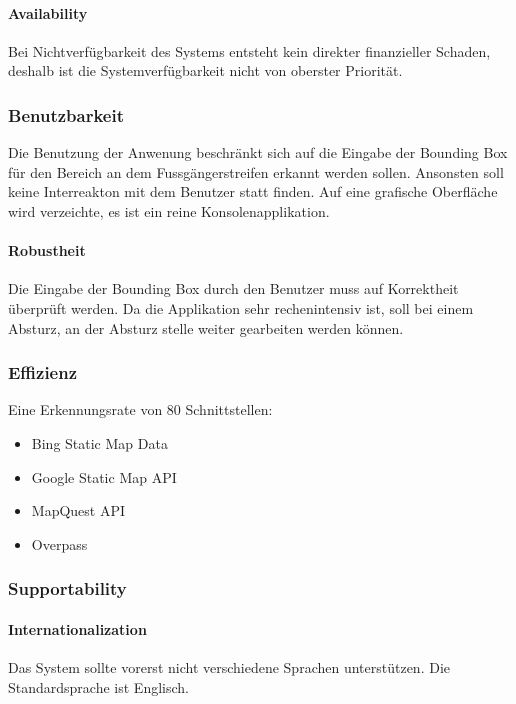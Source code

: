 \paragraph{Availability}
Bei Nichtverfügbarkeit des Systems entsteht kein direkter finanzieller Schaden, deshalb ist die Systemverfügbarkeit nicht von oberster Priorität. 
\subsubsection{Benutzbarkeit}
Die Benutzung der Anwenung beschränkt sich auf die Eingabe der Bounding Box für den Bereich an dem Fussgängerstreifen erkannt werden sollen. Ansonsten soll keine Interreakton mit dem Benutzer statt finden. Auf eine grafische Oberfläche wird verzeichte, es ist ein reine Konsolenapplikation.

\paragraph{Robustheit}
Die Eingabe der Bounding Box durch den Benutzer muss auf Korrektheit überprüft werden. Da die Applikation sehr rechenintensiv ist, soll bei einem Absturz, an der Absturz stelle weiter gearbeiten werden können.
\subsubsection{Effizienz}
Eine Erkennungsrate von 80%
Schnittstellen:
\begin{itemize}
	\item Bing Static Map Data
	\item Google Static Map API
	\item MapQuest API
	\item Overpass
\end{itemize}

\subsubsection{Supportability}
\paragraph{Internationalization}
Das System sollte vorerst nicht verschiedene Sprachen unterstützen. 
Die Standardsprache ist Englisch.


